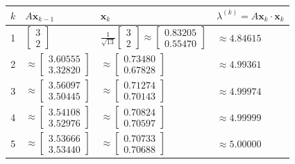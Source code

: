 \documentclass{article}
\begin{document}
\renewcommand{\arraystretch}{1.25}
\begin{center}
\begin{tabular}{|c|l|l|l|}
\hline
$k$ & $A\mathbf{x}_{k-1}$ & $\mathbf{x}_k$ & $\lambda^{(k)} = A\mathbf{x}_k\cdot\mathbf{x}_k$ \\
\hline
1 &
$\begin{bmatrix}3\\2\end{bmatrix}$ &
$\frac{1}{\sqrt{13}}\begin{bmatrix}3\\2\end{bmatrix}\approx\begin{bmatrix}0.83205\\0.55470\end{bmatrix}$ &
$\approx 4.84615$ \\
\hline
2 &
$\approx\begin{bmatrix}3.60555\\3.32820\end{bmatrix}$ &
$\approx\begin{bmatrix}0.73480\\0.67828\end{bmatrix}$ &
$\approx 4.99361$ \\
\hline
3 &
$\approx\begin{bmatrix}3.56097\\3.50445\end{bmatrix}$ &
$\approx\begin{bmatrix}0.71274\\0.70143\end{bmatrix}$ &
$\approx 4.99974$ \\
\hline
4 &
$\approx\begin{bmatrix}3.54108\\3.52976\end{bmatrix}$ &
$\approx\begin{bmatrix}0.70824\\0.70597\end{bmatrix}$ &
$\approx 4.99999$ \\
\hline
5 &
$\approx\begin{bmatrix}3.53666\\3.53440\end{bmatrix}$ &
$\approx\begin{bmatrix}0.70733\\0.70688\end{bmatrix}$ &
$\approx 5.00000$ \\
\hline
\end{tabular}
\end{center}
\end{document}
